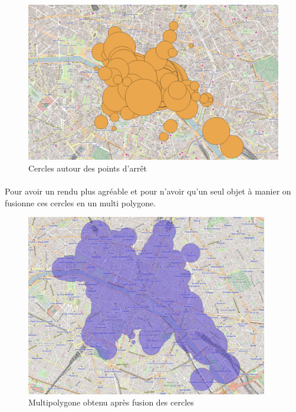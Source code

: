 \documentclass[a4paper]{report}
\begin{document}
\begin{figure}[H]
	\begin{center}
		\includegraphics[width=400pt]{image/premiers_isochrones}
		\caption{Cercles autour des points d'arrêt}
		\label{Cercles autour des points d'arrêt}
	\end{center}
\end{figure}

\paragraph{} Pour avoir un rendu plus agréable et pour n'avoir qu'un seul objet à manier on fusionne ces cercles en un multi polygone.

\begin{figure}[H]
	\begin{center}
		\includegraphics[width=300pt]{image/iso_merged}
		\caption{Multipolygone obtenu après fusion des cercles}
		\label{Multipolygone obtenu après fusion des cercles}
	\end{center}
\end{figure}
\end{document}

